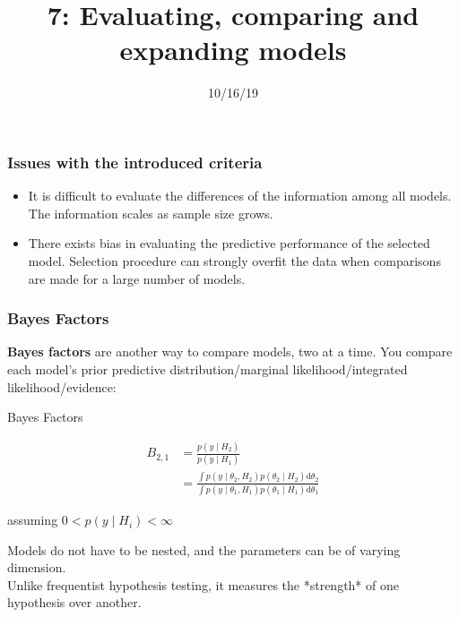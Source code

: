 \documentclass{beamer}
\title["7"]{7: Evaluating, comparing and expanding models}
\date{10/16/19}
\begin{document}

\begin{frame}
\titlepage 
\end{frame}

\begin{frame}
\frametitle{Issues with the introduced criteria}  
\begin{itemize}
\item It is difficult to evaluate the differences of the
  information among all models. The information scales as sample size
  grows.
\item There exists bias in evaluating the predictive performance of
  the selected model. Selection procedure can strongly overfit the data when comparisons are made for a
  large number of models. 
\end{itemize}
\end{frame}


\begin{frame}
\frametitle{Bayes Factors}

{\bf Bayes factors} are another way to compare models, two at a time. You compare each model's prior predictive distribution/marginal likelihood/integrated likelihood/evidence:
\begin{block}{Bayes Factors}

\begin{align*}
B_{2,1} &= \frac{p(y \mid H_2)}{p(y \mid H_1)}\\
&= \frac{\int p(y \mid \theta_2, H_2)p(\theta_2 \mid H_2) \text{d}\theta_2}{\int p(y \mid \theta_1, H_1)p(\theta_1 \mid H_1) \text{d}\theta_1}
\end{align*}

assuming $0 < p(y \mid H_i) < \infty$
\end{block}

Models do not have to be nested, and the parameters can be of varying dimension. \\
Unlike frequentist hypothesis testing, it measures the *strength* of one hypothesis over another.

\end{frame}
\end{document}
